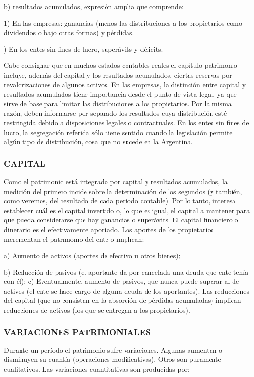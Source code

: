 b) resultados acumulados, expresión amplia que comprende:

1) En las empresas: ganancias (menos las distribuciones a los propietarios como dividendos o bajo otras formas) y pérdidas.

{) En los entes sin fines de lucro, superávits y déficits.\par}

Cabe consignar que en muchos estados contables reales el capítulo patrimonio incluye, además del capital y los resultados acumulados, ciertas reservas por revalorizaciones de algunos activos. En las empresas, la distinción entre capital y resultados acumulados tiene importancia desde el punto de vista legal, ya que sirve de base para limitar las distribuciones a los propietarios. Por la misma razón, deben informarse por separado los resultados cuya distribución esté restringida debido a disposiciones legales o contractuales. En los entes sin fines de lucro, la segregación referida sólo tiene sentido cuando la legislación permite algún tipo de distribución, cosa que no sucede en la Argentina.

\subsubsection*{CAPITAL}
Como el patrimonio está integrado por capital y resultados acumulados, la medición del primero incide sobre la determinación de los segundos (y también, como veremos, del resultado de cada período contable). Por lo tanto, interesa establecer cuál es el capital invertido o, lo que es igual, el capital a mantener para que pueda considerarse que hay ganancias o superávits. El capital financiero o dinerario es el efectivamente aportado. Los aportes de los propietarios incrementan el patrimonio del ente o implican:

a) Aumento de activos (aportes de efectivo u otros bienes);

b) Reducción de pasivos (el aportante da por cancelada una deuda que ente tenía con él); c) Eventualmente, aumento de pasivos, que nunca puede superar al de activos (el ente se hace cargo de alguna deuda de los aportantes). Las reducciones del capital (que no consistan en la absorción de pérdidas acumuladas) implican reducciones de activos (los que se entregan a los propietarios).



\subsubsection*{VARIACIONES PATRIMONIALES}
Durante un período el patrimonio sufre variaciones. Algunas aumentan o disminuyen su cuantía (operaciones modificativas). Otros son puramente cualitativos. Las variaciones cuantitativas son producidas por:

